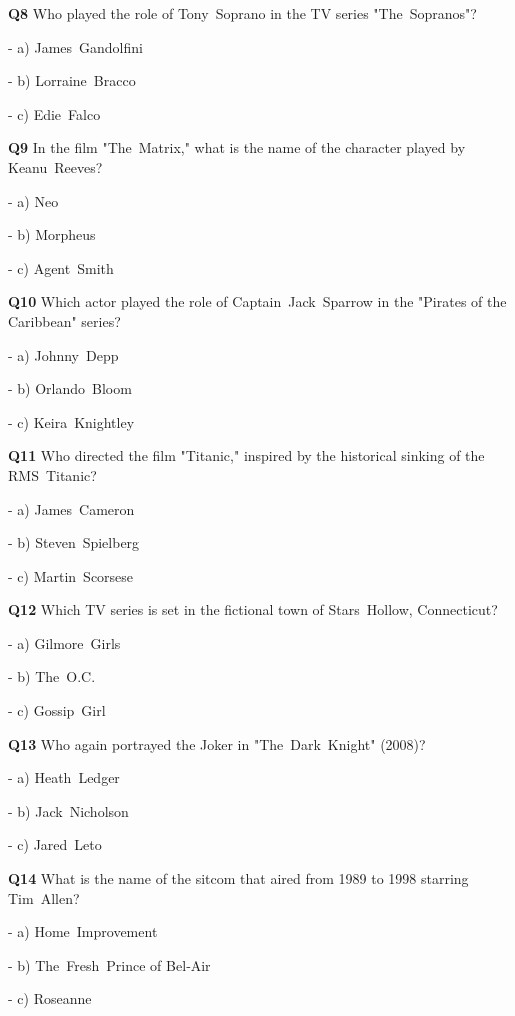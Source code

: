 \textbf{Q8} Who played the role of Tony Soprano in the TV series "The Sopranos"?\par
\quad - a) James Gandolfini\par
\quad - b) Lorraine Bracco\par
\quad - c) Edie Falco\par

\textbf{Q9} In the film "The Matrix," what is the name of the character played by Keanu Reeves?\par
\quad - a) Neo\par
\quad - b) Morpheus\par
\quad - c) Agent Smith\par

\textbf{Q10} Which actor played the role of Captain Jack Sparrow in the "Pirates of the Caribbean" series?\par
\quad - a) Johnny Depp\par
\quad - b) Orlando Bloom\par
\quad - c) Keira Knightley\par

\textbf{Q11} Who directed the film "Titanic," inspired by the historical sinking of the RMS Titanic?\par
\quad - a) James Cameron\par
\quad - b) Steven Spielberg\par
\quad - c) Martin Scorsese\par

\textbf{Q12} Which TV series is set in the fictional town of Stars Hollow, Connecticut?\par
\quad - a) Gilmore Girls\par
\quad - b) The O.C.\par
\quad - c) Gossip Girl\par

\textbf{Q13} Who again portrayed the Joker in "The Dark Knight" (2008)?\par
\quad - a) Heath Ledger\par
\quad - b) Jack Nicholson\par
\quad - c) Jared Leto\par

\textbf{Q14} What is the name of the sitcom that aired from 1989 to 1998 starring Tim Allen?\par
\quad - a) Home Improvement\par
\quad - b) The Fresh Prince of Bel‑Air\par
\quad - c) Roseanne\par

